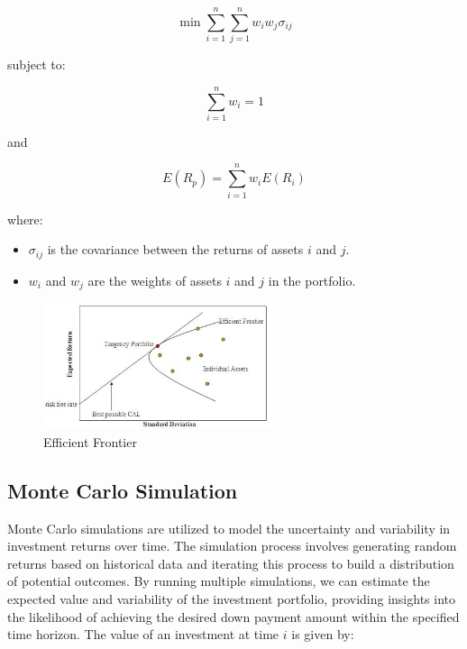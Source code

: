 \begin{equation}
\min \sum_{i=1}^n \sum_{j=1}^n w_i w_j \sigma_{ij}
\end{equation}

subject to:

\begin{equation}
\sum_{i=1}^n w_i = 1
\end{equation}

and

\begin{equation}
E(R_p) = \sum_{i=1}^n w_iE(R_i)
\end{equation}

where:
\begin{itemize}
    \item $\sigma_{ij}$ is the covariance between the returns of assets $i$ and $j$.
    \item $w_i$ and $w_j$ are the weights of assets $i$ and $j$ in the portfolio.
\end{itemize}

\begin{figure}[h!]
    \centering
    \includegraphics[width=0.6\textwidth]{../Figures/efficient_frontier.png}
    \caption{Efficient Frontier}
    \label{fig:efficient_frontier}
\end{figure}


\subsection{Monte Carlo Simulation}
Monte Carlo simulations are utilized to model the uncertainty and variability in investment returns over time. The simulation process involves generating random returns based on historical data and iterating this process to build a distribution of potential outcomes. By running multiple simulations, we can estimate the expected value and variability of the investment portfolio, providing insights into the likelihood of achieving the desired down payment amount within the specified time horizon. The value of an investment at time $i$ is given by:

